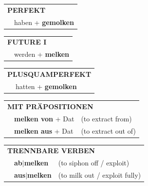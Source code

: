 \documentclass[10pt,a4paper]{revtex4-2}
\begin{document}
\begin{verbbox}
    \vspace{10pt}

 \begin{tabular}{rl}
     \multicolumn{2}{l}{\textbf{PERFEKT}}\\
   & haben + \textbf{gemolken}\\
  \end{tabular}
\hfill
   \begin{tabular}{rl}
   
    \multicolumn{2}{l}{\textbf{FUTURE I} }\\
   & werden + \textbf{melken}\\
 
  \end{tabular}
\hfill
   \begin{tabular}{rl}
      \multicolumn{2}{l}{\textbf{PLUSQUAMPERFEKT}}\\
   & hatten + \textbf{gemolken}\\
  \end{tabular}

   \vspace{10pt}

   \begin{tabular}{lll}
      \multicolumn{3}{l}{\textbf{MIT PRÄPOSITIONEN}}\\
& \textbf{melken von} + Dat & (to extract from)\\
& \textbf{melken aus} + Dat & (to extract out of)\\
   \end{tabular}
  \hfill
   \begin{tabular}{lll}
      \multicolumn{3}{l}{\textbf{TRENNBARE VERBEN}}\\
 & \textbf{ab$|$melken} & (to siphon off / exploit)\\
 & \textbf{aus$|$melken} & (to milk out / exploit fully)\\
  \end{tabular}

\vspace{-5pt}

\end{verbbox}
\end{document}
